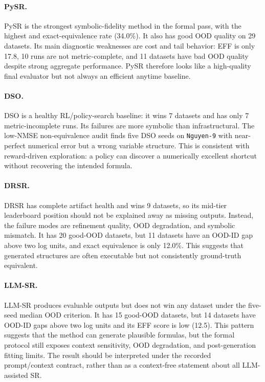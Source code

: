 \paragraph{PySR.}
PySR is the strongest symbolic-fidelity method in the formal pass, with the highest \symf{} and exact-equivalence rate (34.0\%). It also has good OOD quality on 29 datasets. Its main diagnostic weaknesses are cost and tail behavior: EFF is only 17.8, 10 runs are not metric-complete, and 11 datasets have bad OOD quality despite strong aggregate performance. PySR therefore looks like a high-quality final evaluator but not always an efficient anytime baseline.

\paragraph{DSO.}
DSO is a healthy RL/policy-search baseline: it wins 7 datasets and has only 7 metric-incomplete runs. Its failures are more symbolic than infrastructural. The low-NMSE non-equivalence audit finds five DSO seeds on \texttt{Nguyen-9} with near-perfect numerical error but a wrong variable structure. This is consistent with reward-driven exploration: a policy can discover a numerically excellent shortcut without recovering the intended formula.

\paragraph{DRSR.}
DRSR has complete artifact health and wins 9 datasets, so its mid-tier leaderboard position should not be explained away as missing outputs. Instead, the failure modes are refinement quality, OOD degradation, and symbolic mismatch. It has 20 good-OOD datasets, but 11 datasets have an OOD-ID gap above two log units, and exact equivalence is only 12.0\%. This suggests that generated structures are often executable but not consistently ground-truth equivalent.

\paragraph{LLM-SR.}
LLM-SR produces evaluable outputs but does not win any dataset under the five-seed median OOD criterion. It has 15 good-OOD datasets, but 14 datasets have OOD-ID gaps above two log units and its EFF score is low (12.5). This pattern suggests that the method can generate plausible formulas, but the formal \core{} protocol still exposes context sensitivity, OOD degradation, and post-generation fitting limits. The result should be interpreted under the recorded prompt/context contract, rather than as a context-free statement about all LLM-assisted SR.

